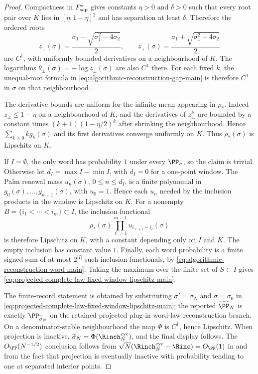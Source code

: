\begin{proof}
Compactness in \(F_{\rm sep}^{\circ}\) gives constants \(\eta>0\) and
\(\delta>0\) such that every root pair over \(K\) lies in
\([\eta,1-\eta]^2\) and has separation at least \(\delta\).  Therefore the
ordered roots
\[
z_-(\sigma)=\frac{\sigma_1-\sqrt{\sigma_1^2-4\sigma_2}}2,\qquad
z_+(\sigma)=\frac{\sigma_1+\sqrt{\sigma_1^2-4\sigma_2}}2
\]
are \(C^1\), with uniformly bounded derivatives on a neighbourhood of \(K\).
The logarithms \(\theta_\pm(\sigma)=-\log z_\pm(\sigma)\) are also \(C^1\)
there.  For each fixed \(k\), the unequal-root formula in
\eqref{eq:algorithmic-reconstruction-gap-main} is therefore \(C^1\) in
\(\sigma\) on that neighbourhood.

The derivative bounds are uniform for the infinite mean appearing in
\(\rho_*\).  Indeed \(z_\pm\le1-\eta\) on a neighbourhood of \(K\), and the
derivatives of \(z_\pm^k\) are bounded by a constant times
\((k+1)(1-\eta/2)^k\) after shrinking the neighbourhood.  Hence
\(\sum_{k\ge0} k g_k(\sigma)\) and its first derivatives converge uniformly
on \(K\).  Thus \(\rho_*(\sigma)\) is Lipschitz on \(K\).

If \(I=\emptyset\), the only word has probability \(1\) under every
\(\PP_\sigma\), so the claim is trivial.  Otherwise let
\(d_I=\max I-\min I\), with \(d_I=0\) for a one-point window.  The Palm
renewal mass \(u_n(\sigma)\), \(0\le n\le d_I\), is a finite polynomial in
\(g_0(\sigma),\ldots,g_{n-1}(\sigma)\), with \(u_0=1\).  Hence each
\(u_n\) needed by the inclusion products in the window is Lipschitz on
\(K\).  For a nonempty \(B=\{i_1<\cdots<i_m\}\subset I\), the inclusion
functional
\[
\rho_*(\sigma)\prod_{\ell=1}^{m-1}
u_{i_{\ell+1}-i_\ell}(\sigma)
\]
is therefore Lipschitz on \(K\), with a constant depending only on \(I\) and
\(K\).  The empty inclusion has constant value \(1\).  Finally, each word
probability is a finite signed sum of at most \(2^{|I|}\) such inclusion
functionals, by
\eqref{eq:algorithmic-reconstruction-word-main}.  Taking the maximum over the
finite set of \(S\subset I\) gives
\eqref{eq:projected-complete-law-fixed-window-lipschitz-main}.

The finite-record statement is obtained by substituting
\(\sigma'=\widetilde\sigma_N\) and \(\sigma=\sigma_0\) in
\eqref{eq:projected-complete-law-fixed-window-lipschitz-main}; the reported
\(\widetilde\PP_N\) is exactly \(\PP_{\widetilde\sigma_N}\) on the retained
projected plug-in word-law reconstruction branch.  On a denominator-stable neighbourhood the map
\(\Phi\) is \(C^1\), hence Lipschitz.  When projection is inactive,
\(\widetilde\sigma_N=\Phi(\Rinch_N^{\mathrm{cyc}})\), and the final
display follows.  The \(O_{\PP}(N^{-1/2})\) conclusion follows from
\(\sqrt N(\Rinch_N^{\mathrm{cyc}}-\Rinc)=O_{\PP}(1)\) in
 and from the fact that
projection is eventually inactive with probability tending to one at
separated interior points.
\end{proof}

